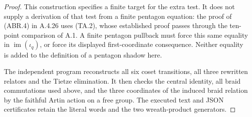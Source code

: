 \begin{proof}
This construction specifies a finite target for the extra test.
It does not supply a derivation of that test from a finite
pentagon equation: the proof of (ABR.4) in A.4.26 uses (TA.2),
whose established proof passes through the ten-point comparison
of A.1.  A finite pentagon pullback must force this same equality
in $\operatorname{im}(\iota_q)$, or force its displayed
first-coordinate consequence.  Neither equality is added to
the definition of a pentagon shadow here.

The independent program
 reconstructs
all six coset transitions, all three rewritten relators and
the Tietze elimination.  It then checks the central identity,
all braid commutations used above, and the three coordinates of
the induced braid relation by the faithful Artin action on a
free group.  The executed text and JSON certificates retain
the literal words and the two wreath-product generators.

\end{proof}
